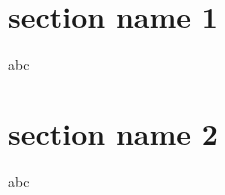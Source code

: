 \documentclass{beamer}
\begin{document}
\section{section name 1}
\begin{frame}
    abc
\end{frame} 

\section{section name 2}
\begin{frame}
    abc
\end{frame} 
\end{document}
